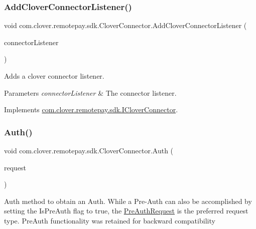 \subsubsection{\texorpdfstring{Add\+Clover\+Connector\+Listener()}{AddCloverConnectorListener()}}
{\footnotesize\ttfamily void com.\+clover.\+remotepay.\+sdk.\+Clover\+Connector.\+Add\+Clover\+Connector\+Listener (\begin{DoxyParamCaption}\item[{\hyperlink{interfacecom_1_1clover_1_1remotepay_1_1sdk_1_1_i_clover_connector_listener}{I\+Clover\+Connector\+Listener}}]{connector\+Listener }\end{DoxyParamCaption})}



Adds a clover connector listener. 


\begin{DoxyParams}{Parameters}
{\em connector\+Listener} & The connector listener.\\
\hline
\end{DoxyParams}


Implements \hyperlink{interfacecom_1_1clover_1_1remotepay_1_1sdk_1_1_i_clover_connector_a90fcd7781afc36d654e42b1c9daada87}{com.\+clover.\+remotepay.\+sdk.\+I\+Clover\+Connector}.

\mbox{\label{classcom_1_1clover_1_1remotepay_1_1sdk_1_1_clover_connector_a2ae641aff3f22e4c5fa651d8deaa7bbd}} 
\subsubsection{\texorpdfstring{Auth()}{Auth()}}
{\footnotesize\ttfamily void com.\+clover.\+remotepay.\+sdk.\+Clover\+Connector.\+Auth (\begin{DoxyParamCaption}\item[{\hyperlink{classcom_1_1clover_1_1remotepay_1_1sdk_1_1_auth_request}{Auth\+Request}}]{request }\end{DoxyParamCaption})}



Auth method to obtain an Auth. While a Pre-\/\+Auth can also be accomplished by setting the Is\+Pre\+Auth flag to true, the \hyperlink{classcom_1_1clover_1_1remotepay_1_1sdk_1_1_pre_auth_request}{Pre\+Auth\+Request} is the preferred request type. Pre\+Auth functionality was retained for backward compatibility 


